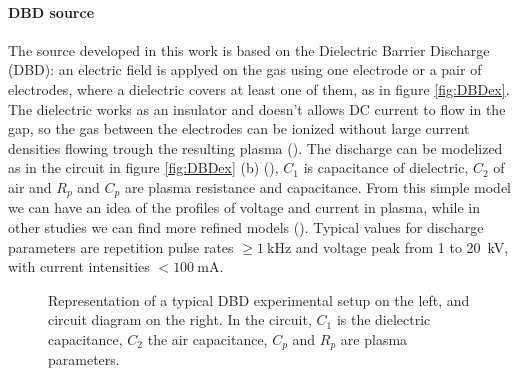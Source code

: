 \paragraph{DBD source}
The source developed in this work is based on the Dielectric Barrier Discharge (DBD): an electric field is applyed on the gas using one electrode or a pair of electrodes, where a dielectric covers at least one of them, as in figure \ref{fig:DBDex}.
The dielectric works as an insulator and doesn't allows DC current to flow in the gap, so the gas between the electrodes can be ionized without large current densities flowing trough the resulting plasma (\cite{Kogelschatz2003}). The discharge can be modelized as in the circuit in figure \ref{fig:DBDex} (b) (\cite{DBDcircuit}), $C_1$ is capacitance of dielectric, $C_2$ of air and $R_p$ and $C_p$ are plasma resistance and capacitance. From this simple model we can have an idea of the profiles of voltage and current in plasma, while in other studies we can find more refined models (\cite{doi:10.1063/1.4986023}). Typical values for discharge parameters are repetition pulse rates $\ge \SI{1}{\kilo\hertz}$ and voltage peak from \num{1} to \SI{20}{\kilo\volt}, with current intensities $<\SI{100}{\milli\ampere}$.
\begin{figure}
 \centering
 \hfill
 \caption{Representation of a typical DBD experimental setup on the left, and circuit diagram on the right. In the circuit, $C_1$ is the dielectric capacitance, $C_2$ the air capacitance, $C_p$ and $R_p$ are plasma parameters.}
\end{figure}

